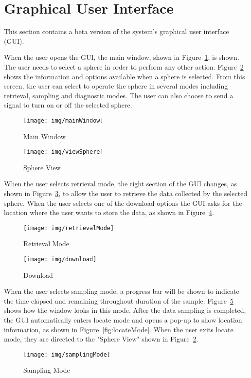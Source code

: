 \section{Graphical User Interface}

This section contains a beta version of the system's graphical user interface (GUI).

When the user opens the GUI, the main window, shown in Figure~\ref{fig:mainWindow}, is shown. The user needs to select a sphere in order to perform any other action.  Figure~\ref{fig:viewSphere} shows the information and options available when a sphere is selected. From this screen, the user can select to operate the sphere in several modes including retrieval, sampling and diagnostic modes.  The user can also choose to send a signal to turn on or off the selected sphere.
\begin{figure}[H]
	\centering
	\texttt{[image: img/mainWindow]}
	\caption{Main Window \label{fig:mainWindow}}
\end{figure}

\begin{figure}[H]
	\centering
	\texttt{[image: img/viewSphere]}
	\caption{Sphere View \label{fig:viewSphere}}
\end{figure}
When the user selects retrieval mode, the right section of the GUI changes, as shown in Figure~\ref{fig:retrievalMode}, to allow the user to retrieve the data collected by the selected sphere.  When the user selects one of the download options the GUI asks for the location where the user wants to store the data, as shown in Figure~\ref{fig:download}. 
\begin{figure}[H]
	\centering
	\texttt{[image: img/retrievalMode]}
	\caption{Retrieval Mode \label{fig:retrievalMode}}
\end{figure}

\begin{figure}[H]
	\centering
	\texttt{[image: img/download]}
	\caption{Download \label{fig:download}}
\end{figure}

When the user selects sampling mode, a progress bar will be shown to indicate the time elapsed and remaining throughout duration of the sample. Figure~\ref{fig:samplingMode} shows how the window looks in this mode. After the data sampling is completed, the GUI automatically enters locate mode and opens a pop-up to show location information, as shown in Figure~\ref{fig:locateMode}.  When the user exits locate mode, they are directed to the "Sphere View" shown in Figure~\ref{fig:viewSphere}.
\begin{figure}[H]
	\centering
	\texttt{[image: img/samplingMode]}
	\caption{Sampling Mode \label{fig:samplingMode}}
\end{figure}

